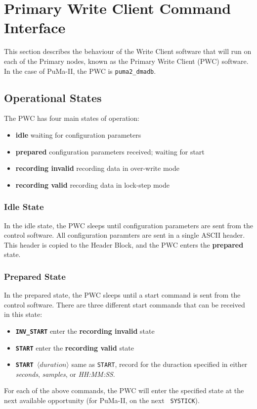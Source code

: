 \newpage
\section{Primary Write Client Command Interface}
\label{sec:pwc}

This section describes the behaviour of the Write Client software that
will run on each of the Primary nodes, known as the Primary Write
Client (PWC) software.  In the case of PuMa-II, the PWC is 
{\tt puma2\_dmadb}.

\subsection{Operational States}

The PWC has four main states of operation:
\vspace{-2mm}
\begin{itemize}
\item {\bf idle} waiting for configuration parameters
\vspace{-2mm}
\item {\bf prepared} configuration parameters received; waiting for start
\vspace{-2mm}
\item {\bf recording invalid} recording data in over-write mode
\vspace{-2mm}
\item {\bf recording valid} recording data in lock-step mode
\end{itemize}

\subsubsection{Idle State}

In the idle state, the PWC sleeps until configuration parameters are
sent from the control software.  All configuration paramters are sent
in a single ASCII header.  This header is copied to the Header Block,
and the PWC enters the {\bf prepared} state.

\subsubsection{Prepared State}

In the prepared state, the PWC sleeps until a start command is sent
from the control software.  There are three different start commands
that can be received in this state:

\begin{itemize}
\item {\tt\bf INV\_START} enter the {\bf recording invalid} state
\vspace{-2mm}
\item {\tt\bf START} enter the {\bf recording valid} state
\vspace{-2mm}
\item {\tt\bf START $\langle duration\rangle$} same as {\tt START}, record
	for the duraction specified in either {\it seconds}, {\it samples},
	or {\it HH:MM:SS}.
\end{itemize}
For each of the above commands, the PWC will enter the specified state
at the next available opportunity (for PuMa-II, on the next {\tt
SYSTICK}).

